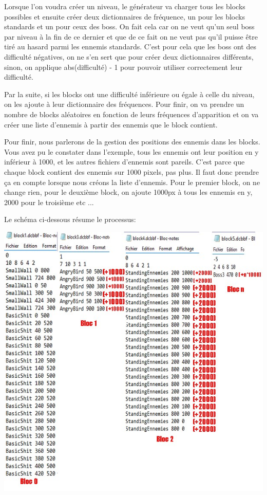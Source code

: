 \documentclass{article}
\begin{document}
Lorsque l'on voudra créer un niveau, le générateur va charger tous les blocks possibles et ensuite créer deux dictionnaires de fréquence, un pour les blocks standards et un pour ceux des boss. On fait cela car on ne veut qu'un seul boss par niveau à la fin de ce dernier et que de ce fait on ne veut pas qu'il puisse être tiré au hasard parmi les ennemis standards. C'est pour cela que les boss ont des difficulté négatives, on ne s'en sert que pour créer deux dictionnaires différents, sinon, on applique abs(difficulté) - 1 pour pouvoir utiliser correctement leur difficulté.
 
Par la suite, si les blocks ont une difficulté inférieure ou égale à celle du niveau, on les ajoute à leur dictionnaire des fréquences. Pour finir, on va prendre un nombre de blocks aléatoires en fonction de leurs fréquences d'apparition et on va créer une liste d'ennemis à partir des ennemis que le block contient. 

Pour finir, nous parlerons de la gestion des positions des ennemis dans les blocks. Vous avez pu le constater dans l'exemple, tous les ennemis ont leur position en y inférieur à 1000, et les autres fichiers d'ennemis sont pareils. C'est parce que chaque block contient des ennemis sur 1000 pixels, pas plus. Il faut donc prendre ça en compte lorsque nous créons la liste d'ennemis. Pour le premier block, on ne change rien, pour le deuxième block, on ajoute 1000px à tous les ennemis en y, 2000 pour le troisième etc ...

Le schéma ci-dessous résume le processus:

\begin{center}
\includegraphics[scale=0.75]{fichiers_rapport/images/explaindcbbf2.jpg}
\end{center}
\end{document}
